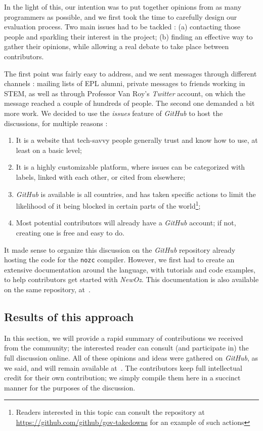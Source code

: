 In the light of this, our intention was to put together opinions from as many programmers as possible, and we first took the time to carefully design our evaluation process.
Two main issues had to be tackled : (a) contacting those people and sparkling their interest in the project; (b) finding an effective way to gather their opinions, while allowing a real debate to take place between contributors.\newline

The first point was fairly easy to address, and we sent messages through different channels : mailing lists of EPL alumni, private messages to friends working in STEM, as well as through Professor Van Roy's \textit{Twitter} account, on which the message reached a couple of hundreds of people.\newline
The second one demanded a bit more work.
We decided to use the \textit{issues} feature of \textit{GitHub} to host the discussions, for multiple reasons :
\begin{enumerate}
    \item It is a website that tech-savvy people generally trust and know how to use, at least on a basic level;
    \item It is a highly customizable platform, where issues can be categorized with labels, linked with each other, or cited from elsewhere;
    \item \textit{GitHub} is available is all countries, and has taken specific actions to limit the likelihood of it being blocked in certain parts of the world\footnote{Readers interested in this topic can consult the repository at \url{https://github.com/github/gov-takedowns} for an example of such actions};
    \item Most potential contributors will already have a \textit{GitHub} account;
    if not, creating one is free and easy to do.
\end{enumerate}
It made sense to organize this discussion on the \textit{GitHub} repository already hosting the code for the \texttt{nozc} compiler.
However, we first had to create an extensive documentation around the language, with tutorials and code examples, to help contributors get started with \textit{NewOz}.
This documentation is also available on the same repository, at~\cite{NozcGitHub}.

\subsection{Results of this approach}\label{subsec:ch4-results}
In this section, we will provide a rapid summary of contributions we received from the community;
the interested reader can consult (and participate in) the full discussion online.
All of these opinions and ideas were gathered on \textit{GitHub}, as we said, and will remain available at~\cite{NozcGitHub}.
The contributors keep full intellectual credit for their own contribution;
we simply compile them here in a succinct manner for the purposes of the discussion.\newline

